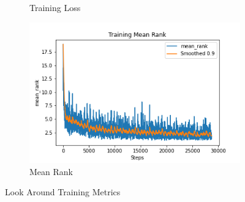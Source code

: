 \begin{figure}[H]
\begin{subfigure}[b]{0.3\textwidth}
         \caption{Training Loss}
         \label{fig:la_t_loss}
     \end{subfigure}
     \hfill
     \begin{subfigure}[b]{0.3\textwidth}
         \centering
         \includegraphics[width=\textwidth]{./figure/results/look_around/training/mean_rank.png}
         \caption{Mean Rank}
         \label{fig:la_t_mean_rank}
     \end{subfigure}
     \caption{Look Around Training Metrics}
     \label{fig:la_t_metrics}
\end{figure}

